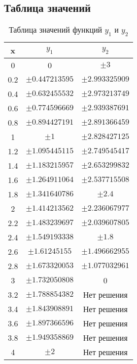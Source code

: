 \documentclass[a4paper, 12pt, oneside]{article}
\newcommand\labeltable[3] {
    \captionsetup{format=tablecaption}
    \begin{table}[H]
        \caption{#2}
        \begin{center}
            #1
        \end{center}
        \label{#3}
    \end{table}
}
\begin{document}
    \subsection{Таблица значений}
    \labeltable{
        \begin{tabular}{|c|c|c|}
            \hline
            x   & $y_1$            & $y_2$            \\
            \hline
            0   & 0                & $\pm3$           \\
            \hline
            0.2 & $\pm0.447213595$ & $\pm2.993325909$ \\
            \hline
            0.4 & $\pm0.632455532$ & $\pm2.973213749$ \\
            \hline
            0.6 & $\pm0.774596669$ & $\pm2.939387691$ \\
            \hline
            0.8 & $\pm0.894427191$ & $\pm2.891366459$ \\
            \hline
            1   & $\pm1$           & $\pm2.828427125$ \\
            \hline
            1.2 & $\pm1.095445115$ & $\pm2.749545417$ \\
            \hline
            1.4 & $\pm1.183215957$ & $\pm2.653299832$ \\
            \hline
            1.6 & $\pm1.264911064$ & $\pm2.537715508$ \\
            \hline
            1.8 & $\pm1.341640786$ & $\pm2.4$         \\
            \hline
            2   & $\pm1.414213562$ & $\pm2.236067977$ \\
            \hline
            2.2 & $\pm1.483239697$ & $\pm2.039607805$ \\
            \hline
            2.4 & $\pm1.549193338$ & $\pm1.8$         \\
            \hline
            2.6 & $\pm1.61245155$  & $\pm1.496662955$ \\
            \hline
            2.8 & $\pm1.673320053$ & $\pm1.077032961$ \\
            \hline
            3   & $\pm1.732050808$ & 0                \\
            \hline
            3.2 & $\pm1.788854382$ & Нет решения      \\
            \hline
            3.4 & $\pm1.843908891$ & Нет решения      \\
            \hline
            3.6 & $\pm1.897366596$ & Нет решения      \\
            \hline
            3.8 & $\pm1.949358869$ & Нет решения      \\
            \hline
            4   & $\pm2$           & Нет решения      \\
            \hline
        \end{tabular}
    }{Таблица значений функций $y_1$ и $y_2$}{tab:task13-values-table}
\end{document}
